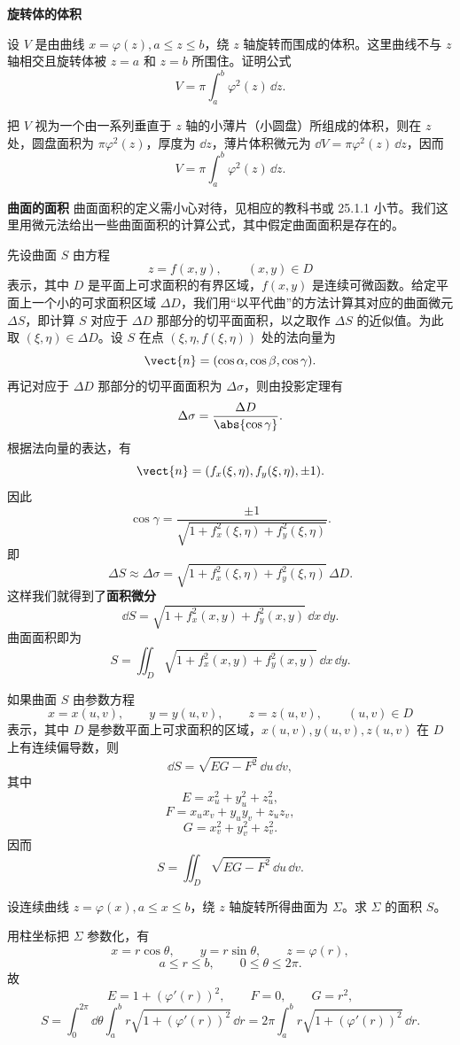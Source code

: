 \textbf{旋转体的体积}

\begin{xexample}[22.5.1]
设 $V$ 是由曲线 $x=\varphi(z),a\le z\le b$，绕 $z$ 轴旋转而围成的体积。这里曲线不与 $z$ 轴相交且旋转体被 $z=a$ 和 $z=b$ 所围住。证明公式
\[
  V=\pi\int_a^b\varphi^2(z)\,\dd z.
\]
\end{xexample}
\begin{xproof}
把 $V$ 视为一个由一系列垂直于 $z$ 轴的小薄片（小圆盘）所组成的体积，则在 $z$ 处，圆盘面积为 $\pi\varphi^2(z)$，厚度为 $\dd z$，薄片体积微元为 $\dd V=\pi\varphi^2(z)\,\dd z$，因而
\[
  V=\pi\int_a^b\varphi^2(z)\,\dd z.
\]
\end{xproof}

\textbf{曲面的面积}
曲面面积的定义需小心对待，见相应的教科书或 25.1.1 小节。我们这里用微元法给出一些曲面面积的计算公式，其中假定曲面面积是存在的。

先设曲面 $S$ 由方程
\[
  z=f(x,y),\qquad(x,y)\in D
\]
表示，其中 $D$ 是平面上可求面积的有界区域，$f(x,y)$ 是连续可微函数。给定平面上一个小的可求面积区域 $\Delta D$，我们用“以平代曲”的方法计算其对应的曲面微元 $\Delta S$，即计算 $S$ 对应于 $\Delta D$ 那部分的切平面面积，以之取作 $\Delta S$ 的近似值。为此取 $(\xi,\eta)\in\Delta D$。设 $S$ 在点 $(\xi,\eta,f(\xi,\eta))$ 处的法向量为
\[
  \vect{n}=(\cos\alpha,\cos\beta,\cos\gamma).
\]
再记对应于 $\Delta D$ 那部分的切平面面积为 $\Delta\sigma$，则由投影定理有
\[
  \Delta\sigma=\frac{\Delta D}{\abs{\cos\gamma}}.
\]
根据法向量的表达，有
\[
  \vect{n}=(f_x(\xi,\eta),f_y(\xi,\eta),\pm1).
\]
因此
\[
  \cos\gamma=\frac{\pm1}{\sqrt{1+f_x^2(\xi,\eta)+f_y^2(\xi,\eta)}}.
\]
即
\[
  \Delta S\approx\Delta\sigma
  =\sqrt{1+f_x^2(\xi,\eta)+f_y^2(\xi,\eta)}\,\Delta D.
\]
这样我们就得到了\textbf{面积微分}
\[
  \dd S=\sqrt{1+f_x^2(x,y)+f_y^2(x,y)}\,\dd x\,\dd y.
\]
曲面面积即为
\[
  S=\iint_D\sqrt{1+f_x^2(x,y)+f_y^2(x,y)}\,\dd x\,\dd y.
\]

如果曲面 $S$ 由参数方程
\[
  x=x(u,v),\qquad y=y(u,v),\qquad z=z(u,v),\qquad(u,v)\in D
\]
表示，其中 $D$ 是参数平面上可求面积的区域，$x(u,v),y(u,v),z(u,v)$ 在 $D$ 上有连续偏导数，则
\[
  \dd S=\sqrt{EG-F^2}\,\dd u\,\dd v,
\]
其中
\[
  E=x_u^2+y_u^2+z_u^2,
\]
\[
  F=x_ux_v+y_uy_v+z_uz_v,
\]
\[
  G=x_v^2+y_v^2+z_v^2.
\]
因而
\[
  S=\iint_D\sqrt{EG-F^2}\,\dd u\,\dd v.
\]

\begin{xexample}[22.5.2]
设连续曲线 $z=\varphi(x),a\le x\le b$，绕 $z$ 轴旋转所得曲面为 $\Sigma$。求 $\Sigma$ 的面积 $S$。
\end{xexample}
\begin{xsolution}
用柱坐标把 $\Sigma$ 参数化，有
\[
  x=r\cos\theta,\qquad y=r\sin\theta,\qquad z=\varphi(r),
\]
\[
  a\le r\le b,\qquad0\le\theta\le2\pi.
\]
故
\[
  E=1+(\varphi'(r))^2,\qquad F=0,\qquad G=r^2,
\]
\[
  S=\int_0^{2\pi}\dd\theta\int_a^b r\sqrt{1+(\varphi'(r))^2}\,\dd r
  =2\pi\int_a^b r\sqrt{1+(\varphi'(r))^2}\,\dd r.
\]
\end{xsolution}

